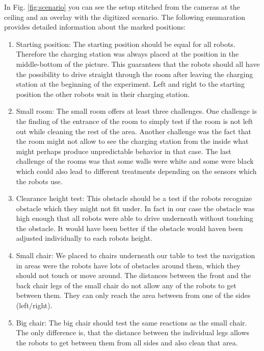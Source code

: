 \documentclass[twoside]{article}
\begin{document}
In Fig. \ref{fig:scenario} you can see the setup stitched from the cameras at the ceiling and an overlay with the digitized scenario. The following enumaration provides detailed information about the marked positions:

\begin{enumerate}
\item Starting position: The starting position should be equal for all robots. Therefore the charging station was always placed at the position in the middle-bottom of the picture. This guarantees that the robots should all have the possibility to drive straight through the room after leaving the charging station at the beginning of the experiment. Left and right to the starting position the other robots wait in their charging station.

\item Small room: The small room offers at least three challenges. One challenge is the finding of the entrance of the room to simply test if the room is not left out while cleaning the rest of the area. Another challenge was the fact that the room might not allow to see the charging station from the inside what might perhaps produce unpredictable behavior in that case. The last challenge of the rooms was that some walls were white and some were black which could also lead to different treatments depending on the sensors which the robots use. 

\item Clearance height test: This obstacle should be a test if the robots recognize obstacle which they might not fit under. In fact in our case the obstacle was high enough that all robots were able to drive underneath without touching the obstacle. It would have been better if the obstacle would haven been adjusted individually to each robots height.

\item Small chair: We placed to chairs underneath our table to test the navigation in areas were the robots have lots of obstacles around them, which they should not touch or move around. The distances between the front and the back chair legs of the small chair do not allow any of the robots to get between them. They can only reach the area between from one of the sides (left/right).

\item Big chair: The big chair should test the same reactions as the small chair. The only difference is, that the distance between the individual legs allows the robots to get between them from all sides and also clean that area. 


\end{enumerate}
\end{document}
